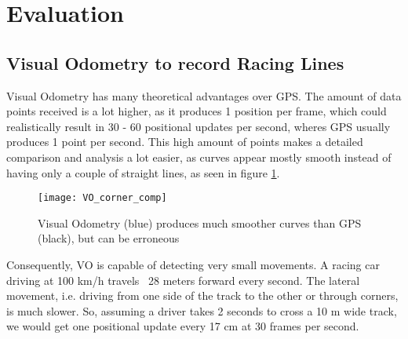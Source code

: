 \section{Evaluation}
\label{sec:evaluation}

\subsection{Visual Odometry to record Racing Lines}
Visual Odometry has many theoretical advantages over GPS. The amount of data points received is a lot higher, as it produces 1 position per frame, which could realistically result in 30 - 60 positional updates per second, wheres GPS usually produces 1 point per second. This high amount of points makes a detailed comparison and analysis a lot easier, as curves appear mostly smooth instead of having only a couple of straight lines, as seen in figure \ref{fig:vo_gps_comp}.

\begin{figure}[!ht]
	\texttt{[image: VO\_corner\_comp]}
	\caption{Visual Odometry (blue) produces much smoother curves than GPS (black), but can be erroneous}
	\label{fig:vo_gps_comp}
\end{figure}

Consequently, VO is capable of detecting very small movements. A racing car driving at 100 km/h travels ~28 meters forward every second. The lateral movement, i.e. driving from one side of the track to the other or through corners, is much slower. So, assuming a driver takes 2 seconds to cross a 10 m wide track, we would get one positional update every 17 cm at 30 frames per second. 

